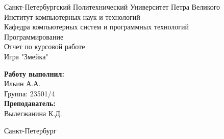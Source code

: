 \documentclass[a4paper]{article}
\begin{document}


\begin{titlepage}	%

	\begin{center}		%

		\large Санкт-Петербургский Политехнический Университет Петра Великого\\
		\large Институт компьютерных наук и технологий \\
		\large Кафедра компьютерных систем и программных технологий\\[6cm]
		
		\huge Программирование\\[0.5cm] %
		\large Отчет по курсовой работе\\[0.1cm]
		\large Игра "Змейка"\\[5cm]

	\end{center}


	\begin{flushright} %
		\begin{minipage}{0.25\textwidth} %
			\begin{flushleft} %

				\large\textbf{Работу выполнил:}\\
				\large Ильин А.А.\\
				\large {Группа:} 23501/4\\
				
				\large \textbf{Преподаватель:}\\
				\large Вылегжанина К.Д.
				

			\end{flushleft}
		\end{minipage}
	\end{flushright}
	
	\vfill %

	\begin{center}
	\large Санкт-Петербург\\
	\large \the\year %
	\end{center} %

\thispagestyle{empty} %
\end{titlepage} %
\end{document}
